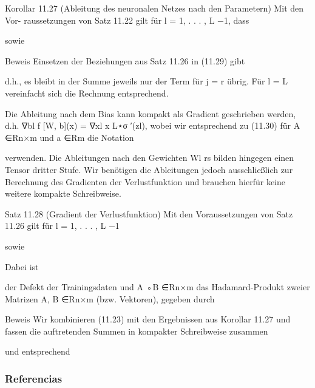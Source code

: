 \begin{frame}
  Korollar 11.27 (Ableitung des neuronalen Netzes nach den Parametern) Mit den Vor-
  raussetzungen von Satz 11.22 gilt für l = 1, . . . , L −1, dass

  sowie

  Beweis Einsetzen der Beziehungen aus Satz 11.26 in (11.29) gibt

  d.h., es bleibt in der Summe jeweils nur der Term für j = r übrig. Für l = L vereinfacht
  sich die Rechnung entsprechend.

  Die Ableitung nach dem Bias kann kompakt als Gradient geschrieben werden, d.h.
  ∇bl f [W, b](x) = ∇xl x L⋆σ ′(zl), wobei wir entsprechend zu (11.30) für A ∈Rn×m und
  a ∈Rm die Notation

  verwenden. Die Ableitungen nach den Gewichten Wl
  rs bilden hingegen einen Tensor dritter
  Stufe. Wir benötigen die Ableitungen jedoch ausschließlich zur Berechnung des Gradienten
  der Verlustfunktion und brauchen hierfür keine weitere kompakte Schreibweise.

  Satz 11.28 (Gradient der Verlustfunktion) Mit den Voraussetzungen von Satz 11.26 gilt
  für l = 1, . . . , L −1

  sowie

  Dabei ist

  der Defekt der Trainingsdaten und A ◦B ∈Rn×m das Hadamard-Produkt zweier Matrizen
  A, B ∈Rn×m (bzw. Vektoren), gegeben durch

  Beweis Wir kombinieren (11.23) mit den Ergebnissen aus Korollar 11.27 und fassen die
  auftretenden Summen in kompakter Schreibweise zusammen

  und entsprechend
\end{frame}

\begin{frame}
  \frametitle{Referencias}

  \nocite{*}
  \printbibliography[heading=none]
\end{frame}
